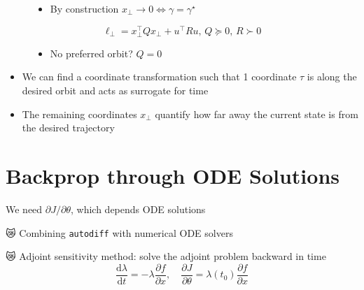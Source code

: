 \documentclass[
]{report}
\providecommand{\tightlist}{%
  \setlength{\itemsep}{0pt}\setlength{\parskip}{0pt}}\usepackage{longtable,booktabs,array}
\begin{document}
\begin{tcolorbox}[enhanced jigsaw, bottomrule=.15mm, arc=.35mm, colframe=quarto-callout-color-frame, breakable, leftrule=.75mm, rightrule=.15mm, colback=white, toprule=.15mm, left=2mm, opacityback=0]
\begin{figure}
\begin{minipage}[t]{0.59\linewidth}
{\begin{itemize}
  \begin{itemize}
  \tightlist
  \item
    \(\tau \in \mathbb{R}\) a surrogate for time
  \item
    \(x_{\bot} \in \mathbb{R}^{2n-1}\) quantify how far away the current
    state is from \(\gamma^\star\)
  \end{itemize}
\item
  By construction \(x_{\bot} \to 0 \iff \gamma = \gamma^\star\)
\end{itemize}

\[\ell_{\bot} = x_\bot^\top Q x_\bot + u^\top R u, \, Q \succeq 0, \, R \succ 0\]

\begin{itemize}
\tightlist
\item
  No preferred orbit? \(Q = 0\)
\end{itemize}

}

\end{minipage}%

\end{figure}

\end{tcolorbox}

\begin{itemize}
\tightlist
\item
  We can find a coordinate transformation such that 1 coordinate
  \(\tau\) is along the desired orbit and acts as surrogate for time
\item
  The remaining coordinates \(x_{\bot}\) quantify how far away the
  current state is from the desired trajectory
\end{itemize}

\hypertarget{backprop-through-ode-solutions}{%
\section{Backprop through ODE
Solutions}\label{backprop-through-ode-solutions}}

We need \(\partial J / \partial \theta\), which depends ODE solutions

{😿} Combining \texttt{autodiff} with numerical ODE solvers

{😿} Adjoint sensitivity method: solve the adjoint problem backward in
time
\[\frac{\text{d}\lambda}{\text{d}t} = -\lambda \frac{\partial f}{\partial x}, \quad \frac{\partial J}{\partial \theta} = \lambda(t_0) \frac{\partial f}{\partial x}\]
\end{document}
